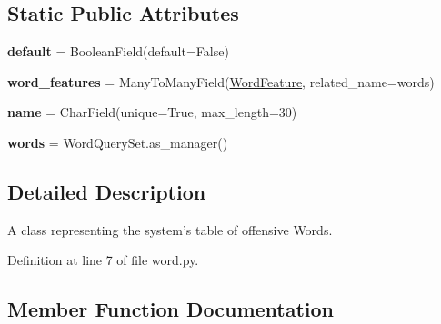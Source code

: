 \subsection*{Static Public Attributes}
\begin{DoxyCompactItemize}
\item 
\mbox{\label{classcapstoneproject_1_1models_1_1models_1_1word_1_1_word_aa5a74600c7d5ecf8c42887672922cfd1}} 
{\bfseries default} = Boolean\+Field(default=False)
\item 
\mbox{\label{classcapstoneproject_1_1models_1_1models_1_1word_1_1_word_a2fdde1fd4fa3d43b78f0a7e7984773d2}} 
{\bfseries word\+\_\+features} = Many\+To\+Many\+Field(\mbox{\hyperlink{classcapstoneproject_1_1models_1_1models_1_1word__feature_1_1_word_feature}{Word\+Feature}}, related\+\_\+name=\textquotesingle{}words\textquotesingle{})
\item 
\mbox{\label{classcapstoneproject_1_1models_1_1models_1_1word_1_1_word_a9c51389998e665f38a20587dce68787a}} 
{\bfseries name} = Char\+Field(unique=True, max\+\_\+length=30)
\item 
\mbox{\label{classcapstoneproject_1_1models_1_1models_1_1word_1_1_word_ade3a1aaf6828879393d5fe7b13dab22b}} 
{\bfseries words} = Word\+Query\+Set.\+as\+\_\+manager()
\end{DoxyCompactItemize}


\subsection{Detailed Description}
\begin{DoxyVerb}A class representing the system's table of offensive Words.\end{DoxyVerb}
 

Definition at line 7 of file word.\+py.



\subsection{Member Function Documentation}
\mbox{\label{classcapstoneproject_1_1models_1_1models_1_1word_1_1_word_a0023cc31fbc8ecd7badc10b6dbf28dfe}} 
